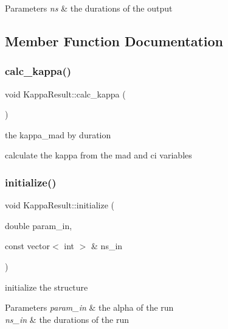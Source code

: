 \begin{DoxyParams}{Parameters}
{\em ns} & the durations of the output \\
\hline
\end{DoxyParams}


\subsection{Member Function Documentation}
\mbox{\label{structKappaResult_a54228c60b4691f2b1621aa07b1e0437f}} 
\subsubsection{\texorpdfstring{calc\+\_\+kappa()}{calc\_kappa()}}
{\footnotesize\ttfamily void Kappa\+Result\+::calc\+\_\+kappa (\begin{DoxyParamCaption}{ }\end{DoxyParamCaption})\hspace{0.3cm}{\ttfamily [inline]}}



the kappa\+\_\+mad by duration 

calculate the kappa from the mad and ci variables \mbox{\label{structKappaResult_a73d7fdfa72149f5ec74b22a203f418b9}} 
\subsubsection{\texorpdfstring{initialize()}{initialize()}}
{\footnotesize\ttfamily void Kappa\+Result\+::initialize (\begin{DoxyParamCaption}\item[{double}]{param\+\_\+in,  }\item[{const vector$<$ int $>$ \&}]{ns\+\_\+in }\end{DoxyParamCaption})\hspace{0.3cm}{\ttfamily [inline]}}



initialize the structure 


\begin{DoxyParams}{Parameters}
{\em param\+\_\+in} & the alpha of the run \\
\hline
{\em ns\+\_\+in} & the durations of the run \\
\hline
\end{DoxyParams}
\mbox{\label{structKappaResult_a8dd8b127d34165637298435377489cff}} 
